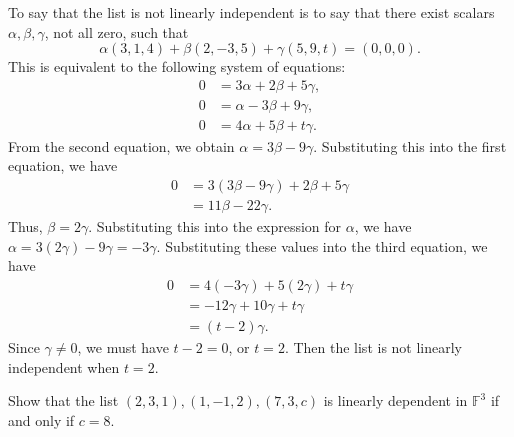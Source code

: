 \begin{sol}
    To say that the list is not linearly independent is to say that there exist scalars $\alpha, \beta, \gamma$, not all zero, such that
    \[\alpha(3, 1, 4) + \beta(2, -3, 5) + \gamma(5, 9, t) = (0, 0, 0).\]
    This is equivalent to the following system of equations:
    \begin{align*}
        0 & = 3\alpha + 2\beta + 5\gamma, \\
        0 & = \alpha - 3\beta + 9\gamma, \\
        0 & = 4\alpha + 5\beta + t\gamma.
    \end{align*}
    From the second equation, we obtain $\alpha = 3\beta - 9\gamma$. Substituting this into the first equation, we have
    \begin{align*}
        0 & = 3(3\beta - 9\gamma) + 2\beta + 5\gamma \\
        & = 11\beta - 22\gamma.
    \end{align*}
    Thus, $\beta = 2\gamma$. Substituting this into the expression for $\alpha$, we have $\alpha = 3(2\gamma) - 9\gamma = -3\gamma$. Substituting these values into the third equation, we have
    \begin{align*}
        0 & = 4(-3\gamma) + 5(2\gamma) + t\gamma \\
        & = -12\gamma + 10\gamma + t\gamma \\
        & = (t - 2)\gamma.
    \end{align*}
    Since $\gamma \neq 0$, we must have $t - 2 = 0$, or $t = 2$. Then the list is not linearly independent when $t = 2$.
\end{sol}
 
\begin{exercise}[2a6]
    Show that the list $(2, 3, 1), (1, -1, 2), (7, 3, c)$ is linearly dependent in $\mathbb{F}^3$ if and only if $c = 8$.
\end{exercise}

